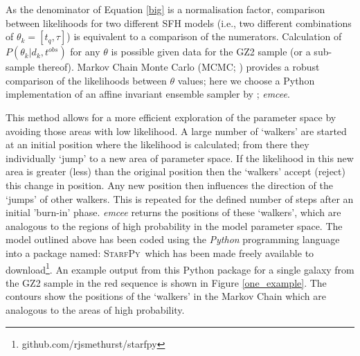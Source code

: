 \documentclass[useAMS,usenatbib]{mn2e}
\def\changed    {\color{titlecol} }
\def\starfpy {\textsc{StarfPy}}
\begin{document}
As the denominator of Equation \ref{big} is a normalisation factor, comparison between likelihoods for two different SFH models (i.e., two different combinations of $\theta_k = [t_q, \tau]$) is equivalent to a comparison of the numerators. Calculation of $P(\theta_k|d_k, t^{obs})$  for any $\theta$ is possible given data for the GZ2 sample (or a sub-sample thereof). Markov Chain Monte Carlo (MCMC; \citealt{MacKay, Dan, GW10}) provides a robust comparison of the likelihoods between $\theta$ values; here we choose a Python implementation of an affine invariant ensemble sampler by \cite{Dan}; \emph{emcee}.

This method allows for a more efficient exploration of the parameter space by avoiding those areas with low likelihood. A large number of `walkers' are started at an initial position where the likelihood is calculated; from there they individually `jump' to a new area of parameter space. If the likelihood in this new area is greater (less) than the original position then the `walkers' accept (reject) this change in position. Any new position then influences the direction of the  `jumps' of other walkers.  {\changed This is repeated for the defined number of steps after an initial 'burn-in' phase. \emph{emcee} returns the positions of these `walkers', which are analogous to the regions of high probability in the model parameter space.} The model outlined above has been coded using the \emph{Python} programming language into a package named: \starfpy ~which has been made freely available to download\footnote{{\changed github.com/rjsmethurst/starfpy}}. {\changed An example output from this Python package for a single galaxy from the GZ2 sample in the red sequence is shown in Figure \ref{one_example}. The contours show the positions of the `walkers' in the Markov Chain which are analogous to the areas of high probability.}
\end{document}
